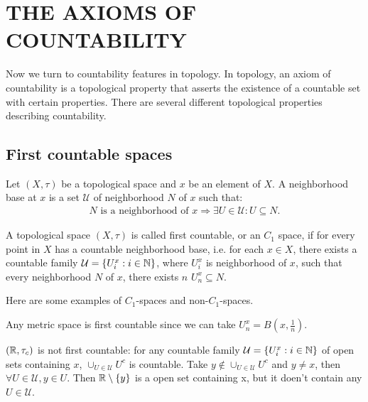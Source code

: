 \chapter{THE AXIOMS OF COUNTABILITY
}\label{chp:2_1_1}

Now we turn to countability features in topology. In topology, an axiom of countability is a topological property that asserts the existence of a countable set with certain
properties. There are several different topological properties describing countability.

\section{First countable spaces}

\begin{definition}{}{}
    Let $(X,\tau)$ be a topological space and $x$ be an element of $X$.
    A neighborhood base at $x$ is a set $\mathcal{U}$ of neighborhood $N$ of $x$ such that:
    \begin{align*}
        N\text{ is a neighborhood of }x\Rightarrow \exists U\in\mathcal{U}:U\subseteq N.
    \end{align*}
\end{definition}

\begin{definition}{}{}
    A topological space $(X,\tau)$ is called first countable, or an $C_1$ space, if 
    for every point in $X$ has a countable neighborhood base, i.e.
    for each $x\in X$, there exists a countable family $\mathcal{U}=\{U_i^x:i\in\mathbb{N}\}$, where $U_i^x$ is neighborhood of $x$,
    such that every neighborhood $N$ of $x$, there exists $n$  $U_n^x\subseteq N$.
\end{definition}


Here are some examples of $C_1$-spaces and non-$C_1$-spaces.

\begin{example}{}{}
    Any metric space is first countable since we can take $U_n^x=B(x,\frac{1}{n})$.
\end{example}

\begin{example}{}{}
    $(\mathbb{R},\tau_c)$ is not first countable: for any countable family $\mathcal{U}=\{U_i^x:i\in\mathbb{N}\}$ of open sets containing $x$,
    $\cup_{U\in\mathcal{U}}U^c$ is countable. Take $y\notin \cup_{U\in\mathcal{U}}U^c$ and $y\neq x$, then $\forall U\in\mathcal{U}, y\in U$. 
    Then $\mathbb{R}\setminus\{y\}$ is a open set containing x, but it doen't contain any $U\in\mathcal{U}$. 
\end{example}


